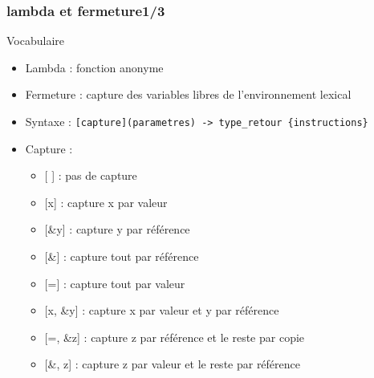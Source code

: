 \documentclass[C++.tex]{subfiles}
\begin{document}
\begin{frame}[fragile]
	\frametitle{lambda et fermeture\titlehfill{}1/3}
	\begin{block}{Vocabulaire}
		\begin{itemize}
			\item Lambda : fonction anonyme
			\item Fermeture : capture des variables libres de l'environnement lexical
		\end{itemize}
	\end{block}

	\pause

	\begin{itemize}
		\item Syntaxe : \lstinline|[capture](parametres) -> type_retour {instructions}|
		\item Capture :
		\begin{itemize}
			\item{} [ ] : pas de capture
			\item{} [x] : capture x par valeur
			\item{} [\&y] : capture y par référence
			\item{} [\&] : capture tout par référence
			\item{} [=]  : capture tout par valeur
			\item{} [x, \&y] : capture x par valeur et y par référence
			\item{} [=, \&z] : capture z par référence et le reste par copie
			\item{} [\&, z] : capture z par valeur et le reste par référence
		\end{itemize}
	\end{itemize}
\end{frame}
\end{document}

